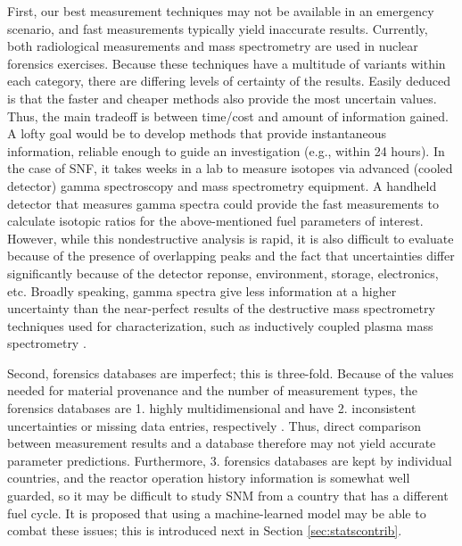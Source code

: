 First, our best measurement techniques may not be available in an emergency
scenario, and fast measurements typically yield inaccurate results.  Currently,
both radiological measurements and mass spectrometry are used in nuclear
forensics exercises.  Because these techniques have a multitude of variants
within each category, there are differing levels of certainty of the results.
Easily deduced is that the faster and cheaper methods also provide the most
uncertain values. Thus, the main tradeoff is between time/cost and amount of
information gained. A lofty goal would be to develop methods that provide
instantaneous information, reliable enough to guide an investigation (e.g.,
within 24 hours).  In the case of \gls{SNF}, it takes weeks in a lab to measure
isotopes via advanced (cooled detector) gamma spectroscopy and mass
spectrometry equipment.  A handheld detector that measures gamma spectra could
provide the fast measurements to calculate isotopic ratios for the
above-mentioned fuel parameters of interest.  However, while this
nondestructive analysis is rapid, it is also difficult to evaluate because of
the presence of overlapping peaks and the fact that uncertainties differ
significantly because of the detector reponse, environment, storage,
electronics, etc. Broadly speaking, gamma spectra give less information at a
higher uncertainty than the near-perfect results of the destructive mass
spectrometry techniques used for characterization, such as inductively coupled
plasma mass spectrometry \cite{iaea_nf}.

Second, forensics databases are imperfect; this is three-fold.  Because of the
values needed for material provenance and the number of measurement types, the
forensics databases are 1. highly multidimensional and have 2. inconsistent
uncertainties or missing data entries, respectively \cite{nf_missingdata}.
Thus, direct comparison between measurement results and a database therefore
may not yield accurate parameter predictions.  Furthermore, 3. forensics
databases are kept by individual countries, and the reactor operation history
information is somewhat well guarded, so it may be difficult to study \gls{SNM}
from a country that has a different fuel cycle.  It is proposed that using a
machine-learned model may be able to combat these issues; this is introduced
next in Section \ref{sec:statscontrib}. 
